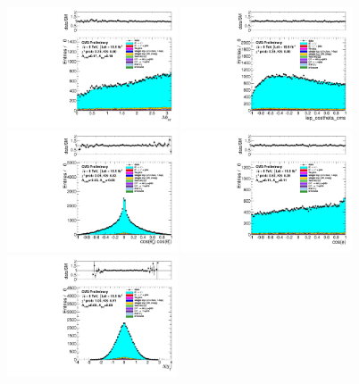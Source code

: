 \begin{figure}[phtb]
  \centering
  \includegraphics[width=0.45\textwidth]{figures/dataMC_lep_azimuthal_asymmetry2_combined.pdf}
  \includegraphics[width=0.45\textwidth]{figures/dataMC_lep_costheta_combined} %
  \includegraphics[width=0.45\textwidth]{figures/dataMC_top_spin_correlation_combined.pdf}
  \includegraphics[width=0.45\textwidth]{figures/dataMC_lep_cos_opening_angle_combined.pdf}
  \includegraphics[width=0.45\textwidth]{figures/dataMC_top_rapiditydiff_Marco_combined.pdf}

\end{figure}
